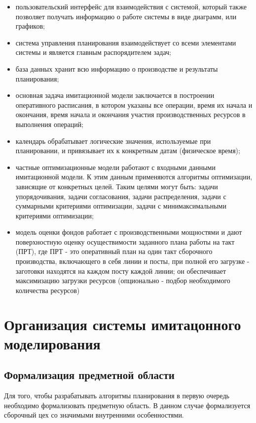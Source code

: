\begin{itemize}
    \item пользовательский интерфейс для взаимодействия с системой, который также позволяет получать информацию о работе системы в виде диаграмм, или графиков; 
    \item система управления планирования взаимодействует со всеми элементами системы и является главным распорядителем задач;
    \item база данных хранит всю информацию о производстве и результаты планирования; 
    \item основная задача имитационной модели заключается в построении оперативного расписания, в котором указаны все операции, время их начала и окончания, время начала и окончания участия производственных ресурсов в выполнения операций;
    \item календарь обрабатывает логические значения, используемые при планировании, и привязывает их к конкретным датам (физическое время);
    \item частные оптимизационные модели работают с входными данными имитационной модели. К этим данным применяются алгоритмы оптимизации, зависящие от конкретных целей. Таким целями могут быть: задачи упорядочивания, задачи согласования, задачи распределения, задачи с суммарными критериями оптимизации, задачи с минимаксимальными критериями оптимизации;
    \item модель оценки фондов работает с производственными мощностями и дают поверхностную оценку осуществимости заданного плана работы на такт (ПРТ), где ПРТ - это оперативный план на один такт сборочного производства, включающего в себя линии и посты, при полной его загрузке - заготовки находятся на каждом посту каждой линии; он обеспечивает максимизацию загрузки ресурсов (опционально - подбор необходимого количества ресурсов)
\end{itemize}

\section{Организация системы имитацонного моделирования}

\subsection{Формализация предметной области}

Для того, чтобы разрабатывать алгоритмы планирования в первую очередь необходимо формализовать предметную область. В данном случае формализуется сборочный цех со значимыми внутренними особенностями.

